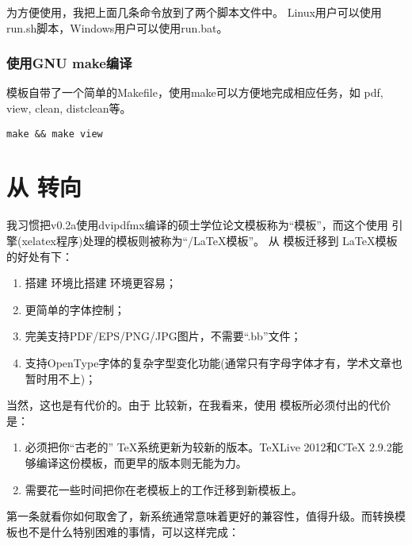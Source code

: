 为方便使用，我把上面几条命令放到了两个脚本文件中。
Linux用户可以使用run.sh脚本，Windows用户可以使用run.bat。

\subsubsection{使用GNU make编译}

模板自带了一个简单的Makefile，使用make可以方便地完成相应任务，如 pdf, view, clean, distclean等。

\begin{lstlisting}[basicstyle=\small\ttfamily, caption={使用GNU make编译}, numbers=none]
make && make view
\end{lstlisting}

\section{从 \CJKLaTeX 转向 \XeTeX}
\label{sec:whydvipdfm}

我习惯把v0.2a使用dvipdfmx编译的硕士学位论文模板称为``\CJKLaTeX 模板''，而这个使用 \XeTeX 引擎(xelatex程序)处理的模板则被称为``\XeTeX/\LaTeX 模板''。
从 \CJKLaTeX 模板迁移到 \XeTeX\LaTeX 模板的好处有下：
\begin{enumerate}
\item[\large\smiley] 搭建 \XeTeX 环境比搭建 \CJKLaTeX 环境更容易；
\item[\large\smiley] 更简单的字体控制；
\item[\large\smiley] 完美支持PDF/EPS/PNG/JPG图片，不需要``.bb''文件；
\item[\large\smiley] 支持OpenType字体的复杂字型变化功能(通常只有字母字体才有，学术文章也暂时用不上)；
\end{enumerate}

当然，这也是有代价的。由于 \XeTeX 比较新，在我看来，使用 \XeTeX 模板所必须付出的代价是：

\begin{enumerate}
\item[\large\frownie] 必须把你“古老的” \TeX 系统更新为较新的版本。TeXLive 2012和CTeX 2.9.2能够编译这份模板，而更早的版本则无能为力。
\item[\large\frownie] 需要花一些时间把你在老模板上的工作迁移到新模板上。
\end{enumerate}

第一条就看你如何取舍了，新系统通常意味着更好的兼容性，值得升级。而转换模板也不是什么特别困难的事情，可以这样完成：


